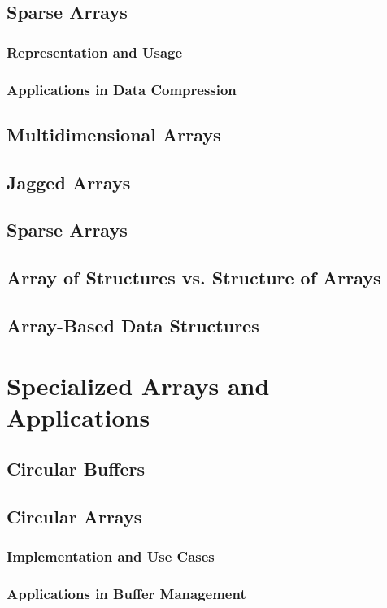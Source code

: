 \documentclass[12pt, oneside]{book}
\begin{document}
	\section{Sparse Arrays}
	\subsection{Representation and Usage}
	\subsection{Applications in Data Compression}
	\section{Multidimensional Arrays}
	\section{Jagged Arrays}
	\section{Sparse Arrays}
	\section{Array of Structures vs. Structure of Arrays}
	\section{Array-Based Data Structures}
		
\chapter{Specialized Arrays and Applications}
	\section{Circular Buffers}
	\section{Circular Arrays}
	\subsection{Implementation and Use Cases}
	\subsection{Applications in Buffer Management}
	
\end{document}
